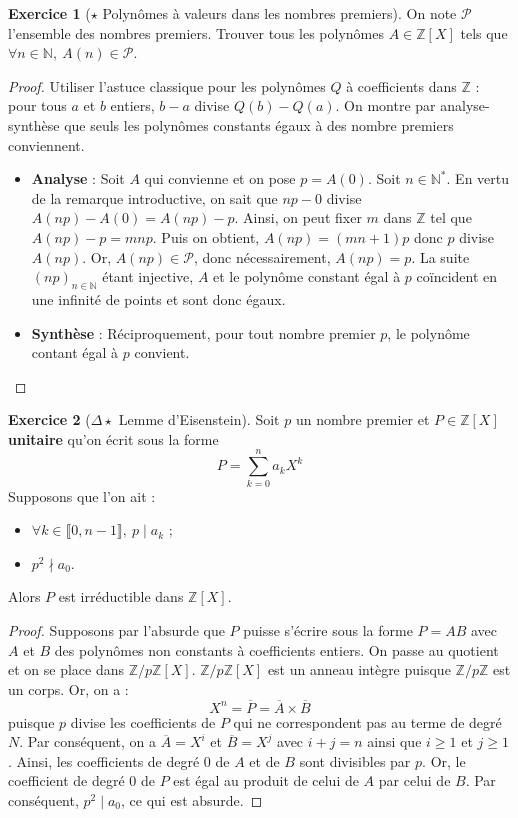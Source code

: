 \documentclass[french]{book}
\newcommand{\N}{\mathbb{N}}
\newcommand{\Z}{\mathbb{Z}}
\newcommand{\st}{^*}
\theoremstyle{definition}
\newtheorem{ex}{Exercice}[chapter]
\theoremstyle{theorem}
\theoremstyle{remark}
\begin{document}
\begin{ex}[$\star$ Polynômes à valeurs dans les nombres premiers]
	On note $\mathcal{P}$ l'ensemble des nombres premiers. Trouver tous les polynômes $A \in \Z[X]$ tels que $\forall n \in \N, \ A(n) \in \mathcal{P}$.
\end{ex}

\begin{proof}
	Utiliser l'astuce classique pour les polynômes $Q$ à coefficients dans $\Z$ : pour tous $a$ et $b$ entiers, $b-a$ divise $Q(b)-Q(a)$. On montre par analyse-synthèse que seuls les polynômes constants égaux à des nombre premiers conviennent.
	\begin{itemize}
		\item \textbf{Analyse} : Soit $A$ qui convienne et on pose $p=A(0)$. Soit $n \in \N\st$. En vertu de la remarque introductive, on sait que $np-0$ divise $A(np)-A(0)=A(np)-p$. Ainsi, on peut fixer $m$ dans $\Z$ tel que $A(np)-p=mnp$. Puis on obtient, $A(np)=(mn+1)p$ donc $p$ divise $A(np)$. Or, $A(np) \in \mathcal{P}$, donc nécessairement, $A(np)=p$. La suite $(np)_{n \in \N}$ étant injective, $A$ et le polynôme constant égal à $p$ coïncident en une infinité de points et sont donc égaux.
		\item \textbf{Synthèse} : Réciproquement, pour tout nombre premier $p$, le polynôme contant égal à $p$ convient.
	\end{itemize}
\end{proof}

\begin{ex}[$\Delta\star$ Lemme d'Eisenstein]
	Soit $p$ un nombre premier et $P\in\Z[X]$ \textbf{unitaire} qu'on écrit sous la forme $$P=\sum_{k=0}^{n}a_kX^k$$ Supposons que l'on ait :
	\begin{itemize}
		\item $\forall k\in\llbracket0,n-1\rrbracket,\ p\mid a_k$ ;
		\item $p^2\nmid a_0$.
	\end{itemize}
	Alors $P$ est irréductible dans $\Z[X]$.
\end{ex}

\begin{proof}
	Supposons par l'absurde que $P$ puisse s'écrire sous la forme $P=AB$ avec $A$ et $B$ des polynômes non constants à coefficients entiers. On passe au quotient et on se place dans $\Z/p\Z[X]$. $\Z/p\Z[X]$ est un anneau intègre puisque $\Z/p\Z$ est un corps. Or, on a : $$X^n=\overline{P}=\overline{A}\times\overline{B}$$ puisque $p$ divise les coefficients de $P$ qui ne correspondent pas au terme de degré $N$. Par conséquent, on a $\overline{A}=X^i$ et $\overline{B}=X^j$ avec $i+j=n$ ainsi que $i\geqslant 1$ et $j\geqslant 1$. Ainsi, les coefficients de degré $0$ de $A$ et de $B$ sont divisibles par $p$. Or, le coefficient de degré $0$ de $P$ est égal au produit de celui de $A$ par celui de $B$. Par conséquent, $p^2\mid a_0$, ce qui est absurde.
\end{proof}
\end{document}
